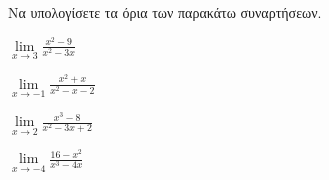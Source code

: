 Να υπολογίσετε τα όρια των παρακάτω συναρτήσεων.
\begin{multicols}{2}
\begin{alist}
\item $ \lim\limits_{x\to 3}\frac{x^2-9}{x^2-3x} $
\item $ \lim\limits_{x\to -1}\frac{x^2+x}{x^2-x-2} $
\item $ \lim\limits_{x\to2}\frac{x^3-8}{x^2-3x+2} $
\item $ \lim\limits_{x\to -4}{\frac{16-x^2}{x^3-4x}} $
\end{alist}
\end{multicols}
